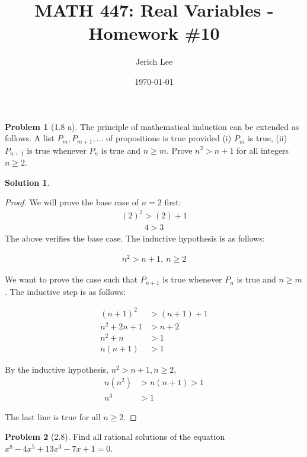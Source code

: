 \documentclass[12pt]{article}
\title{MATH 447: Real Variables - Homework \#10}
\author{Jerich Lee}
\date{\today}
\theoremstyle{definition} %
\newtheorem{solution}{Solution}
\newtheorem{problem}{Problem}
\theoremstyle{plain} %
\begin{document}
\maketitle

\begin{problem}[1.8 a]
The principle of mathematical induction can be extended as follows. A list $P_{m}, P_{m+1}, \dots$ of propositions is true provided (i) $P_{m}$ is true, (ii) $P_{n+1}$ is true whenever $P_{n}$ is true and $n\geq m$.
Prove $n^2>n+1$ for all integers $n\geq2$.
\end{problem}

\begin{solution}
\begin{proof}
    We will prove the base case of $n=2$ first:
\begin{align}
(2)^2>(2)+1
\end{align}
\begin{align}
4>3
\end{align}
The above verifies the base case. The inductive hypothesis is as follows:

\begin{align}
n^2>n+1, \ n\geq 2
\end{align}

We want to prove the case such that $P_{n+1}$ is true whenever $P_{n}$ is true and $n\geq m$. The inductive step is as follows:

\begin{align}
(n+1)^2 &> (n+1)+1 \\
n^2+2n+1 &> n+2 \\
n^2+n &> 1 \\
n(n+1) &> 1
\end{align}

By the inductive hypothesis, $n^2>n+1, n\geq 2$,
\begin{align}
n(n^2) &> n(n+1) > 1 \\
n^3 &> 1
\end{align}

The last line is true for all $n\geq 2$.  
\end{proof}

\end{solution}
\begin{problem}[2.8]
    Find all rational solutions of the equation $x^8-4x^5+13x^3-7x+1=0$.
\end{problem}
\end{document}
